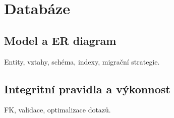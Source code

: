 \chapter{Databáze}
\label{chap:db}

\section{Model a ER diagram}
Entity, vztahy, schéma, indexy, migrační strategie.

\section{Integritní pravidla a výkonnost}
FK, validace, optimalizace dotazů.
